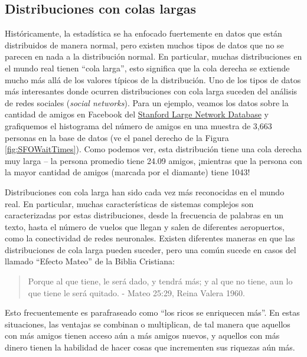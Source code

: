 \documentclass[
  12pt,
]{book}
\begin{document}
\hypertarget{distribuciones-con-colas-largas}{%
\subsection{Distribuciones con colas largas}\label{distribuciones-con-colas-largas}}

Históricamente, la estadística se ha enfocado fuertemente en datos que están distribuidos de manera normal, pero existen muchos tipos de datos que no se parecen en nada a la distribución normal. En particular, muchas distribuciones en el mundo real tienen ``cola larga'', esto significa que la cola derecha se extiende mucho más allá de los valores típicos de la distribución. Uno de los tipos de datos más interesantes donde ocurren distribuciones con cola larga suceden del análisis de redes sociales (\emph{social networks}). Para un ejemplo, veamos los datos sobre la cantidad de amigos en Facebook del \href{https://snap.stanford.edu/data/egonets-Facebook.html}{Stanford Large Network Database} y grafiquemos el histograma del número de amigos en una muestra de 3,663 personas en la base de datos (ve el panel derecho de la Figura \ref{fig:SFOWaitTimes}). Como podemos ver, esta distribución tiene una cola derecha muy larga -- la persona promedio tiene 24.09 amigos, ¡mientras que la persona con la mayor cantidad de amigos (marcada por el diamante) tiene 1043!

Distribuciones con cola larga han sido cada vez más reconocidas en el mundo real. En particular, muchas características de sistemas complejos son caracterizadas por estas distribuciones, desde la frecuencia de palabras en un texto, hasta el número de vuelos que llegan y salen de diferentes aeropuertos, como la conectividad de redes neuronales. Existen diferentes maneras en que las distribuciones de cola larga pueden suceder, pero una común sucede en casos del llamado ``Efecto Mateo'' de la Biblia Cristiana:

\begin{quote}
Porque al que tiene, le será dado, y tendrá más; y al que no tiene, aun lo que tiene le será quitado. - Mateo 25:29, Reina Valera 1960.
\end{quote}

Esto frecuentemente es parafraseado como ``los ricos se enriquecen más''. En estas situaciones, las ventajas se combinan o multiplican, de tal manera que aquellos con más amigos tienen acceso aún a más amigos nuevos, y aquellos con más dinero tienen la habilidad de hacer cosas que incrementen sus riquezas aún más.
\end{document}
